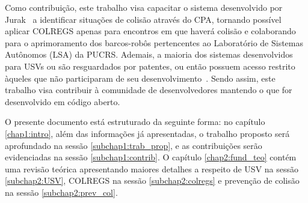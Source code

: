     Como contribuição, este trabalho visa capacitar o sistema desenvolvido por Jurak~\cite{JURAK2020} a identificar situações de colisão através do CPA, tornando possível aplicar COLREGS apenas para encontros em que haverá colisão e colaborando para o aprimoramento dos barcos-robôs pertencentes ao Laboratório de Sistemas Autônomos (LSA) da PUCRS. Ademais, a maioria dos sistemas desenvolvidos para USVs ou são resguardados por patentes, ou então possuem acesso restrito àqueles que não participaram de seu desenvolvimento~\cite{JURAK2020}. Sendo assim, este trabalho visa contribuir à comunidade de desenvolvedores mantendo o que for desenvolvido em código aberto. 
    
    O presente documento está estruturado da seguinte forma: no capítulo \ref{chap1:intro}, além das informações já apresentadas, o trabalho proposto será aprofundado na sessão \ref{subchap1:trab_prop}, e as contribuições serão evidenciadas na sessão \ref{subchap1:contrib}. O capítulo \ref{chap2:fund_teo} contém uma revisão teórica apresentando maiores detalhes a respeito de USV na sessão \ref{subchap2:USV}, COLREGS na sessão \ref{subchap2:colregs} e prevenção de colisão na sessão \ref{subchap2:prev_col}.
    
        
        
